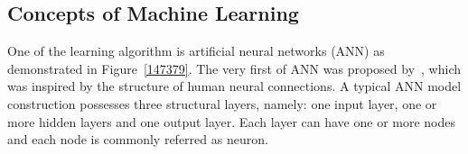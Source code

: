 \subsection{Concepts of Machine Learning}
One of the learning algorithm is artificial neural networks (ANN) as demonstrated in Figure~\ref{147379}. The very first of ANN was proposed by~\citet{McCulloch_1943}, which was inspired by the structure of human neural connections. A typical ANN model construction possesses three structural layers, namely: one input layer, one or more hidden layers and one output layer. Each layer can have one or more nodes and each node is commonly referred as neuron. 